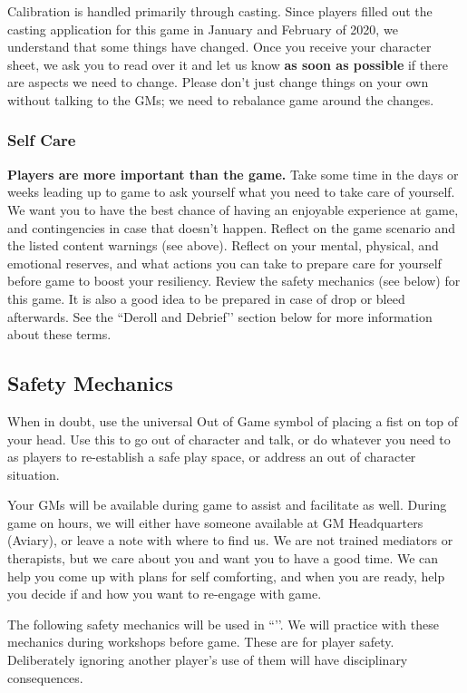 \documentclass[sheet]{GL2020}
\begin{document}
Calibration is handled primarily through casting. Since players filled out the casting application for this game in January and February of 2020, we understand that some things have changed. Once you receive your character sheet, we ask you to read over it and let us know \textbf{as soon as possible} if there are aspects we need to change. Please don’t just change things on your own without talking to the GMs; we need to rebalance game around the changes.

\subsubsection{Self Care}
\textbf{Players are more important than the game.} Take some time in the days or weeks leading up to game to ask yourself what you need to take care of yourself. We want you to have the best chance of having an enjoyable experience at game, and contingencies in case that doesn’t happen. Reflect on the game scenario and the listed content warnings (see above). Reflect on your mental, physical, and emotional reserves, and what actions you can take to prepare care for yourself before game to boost your resiliency. Review the safety mechanics (see below) for this game. It is also a good idea to be prepared in case of drop or bleed afterwards. See the ``Deroll and Debrief’’ section below for more information about these terms.

\subsection{Safety Mechanics}
When in doubt, use the universal Out of Game symbol of placing a fist on top of your head. Use this to go out of character and talk, or do whatever you need to as players to re-establish a safe play space, or address an out of character situation. 

Your GMs will be available during game to assist and facilitate as well. During game on hours, we will either have someone available at GM Headquarters (Aviary), or leave a note with where to find us. We are not trained mediators or therapists, but we care about you and want you to have a good time. We can help you come up with plans for self comforting, and when you are ready, help you decide if and how you want to re-engage with game.

The following safety mechanics will be used in ``\gamename{}’’. We will practice with these mechanics during workshops before game. These are for player safety. Deliberately ignoring another player’s use of them will have disciplinary consequences.
\end{document}
